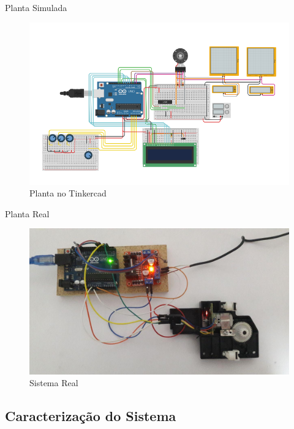 \documentclass{beamer}
\begin{document}
\begin{frame}{Planta Simulada}
\begin{figure}
    \centering
    \includegraphics[width = \linewidth]{src/tex/img/pid_tinkercad.png}
    \caption{Planta no Tinkercad}
    \label{fig:control_1}
\end{figure}
\end{frame}

\begin{frame}{Planta Real}
\begin{figure}
    \centering
    \includegraphics[width = \linewidth]{src/tex/img/full_system.jpg}
    \caption{Sistema Real}
    \label{fig:control_1}
\end{figure}
\end{frame}

\subsection{Caracterização do Sistema}
\end{document}
